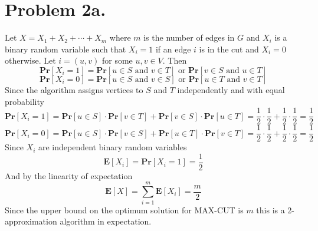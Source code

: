 \documentclass[12pt]{article}
\begin{document}
\pagestyle{plain}
\titleformat{\subsection}[runin]
  {\normalfont\large\bfseries}{\thesubsection}{1em}{}
\titleformat{\subsubsection}[runin]
  {\normalfont\large\bfseries}{\thesubsubsection}{1em}{}

\section*{Problem 2a.}

Let $X = X_1 + X_2 + \cdots + X_m$ where $m$ is the number of edges in $G$ and
$X_i$ is a binary random variable such that $X_i = 1$ if an edge $i$ is in the
cut and $X_i = 0$ otherwise. Let $i = (u,v)$ for some $u,v \in V$. Then
$$\textbf{Pr}[X_i = 1] = \textbf{Pr}[u \in S \text{ and } v \in T] \text{ or }
\textbf{Pr}[v \in S \text{ and } u \in T]$$
$$\textbf{Pr}[X_i = 0] = \textbf{Pr}[u \in S \text{ and } v \in S] \text{ or }
\textbf{Pr}[u \in T \text{ and } v \in T]$$
Since the algorithm assigns vertices to $S$ and $T$ independently and with equal
probability
$$\textbf{Pr}[X_i = 1] = \textbf{Pr}[u \in S]\cdot\textbf{Pr}[v \in T] +
\textbf{Pr}[v \in S]\cdot\textbf{Pr}[u \in T] =
\frac{1}{2}\cdot\frac{1}{2} + \frac{1}{2}\cdot\frac{1}{2} = \frac{1}{2}$$
$$\textbf{Pr}[X_i = 0] = \textbf{Pr}[u \in S]\cdot\textbf{Pr}[v \in S] +
\textbf{Pr}[u \in T]\cdot\textbf{Pr}[v \in T] =
\frac{1}{2}\cdot\frac{1}{2} + \frac{1}{2}\cdot\frac{1}{2} = \frac{1}{2}$$
Since $X_i$ are independent binary random variables
$$\textbf{E}[X_i] = \textbf{Pr}[X_i = 1] = \frac{1}{2}$$
And by the linearity of expectation
$$\textbf{E}[X] = \sum_{i=1}^m \textbf{E}[X_i] = \frac{m}{2}$$
Since the upper bound on the optimum solution for MAX-CUT is $m$ this is a
2-approximation algorithm in expectation.
\end{document}
